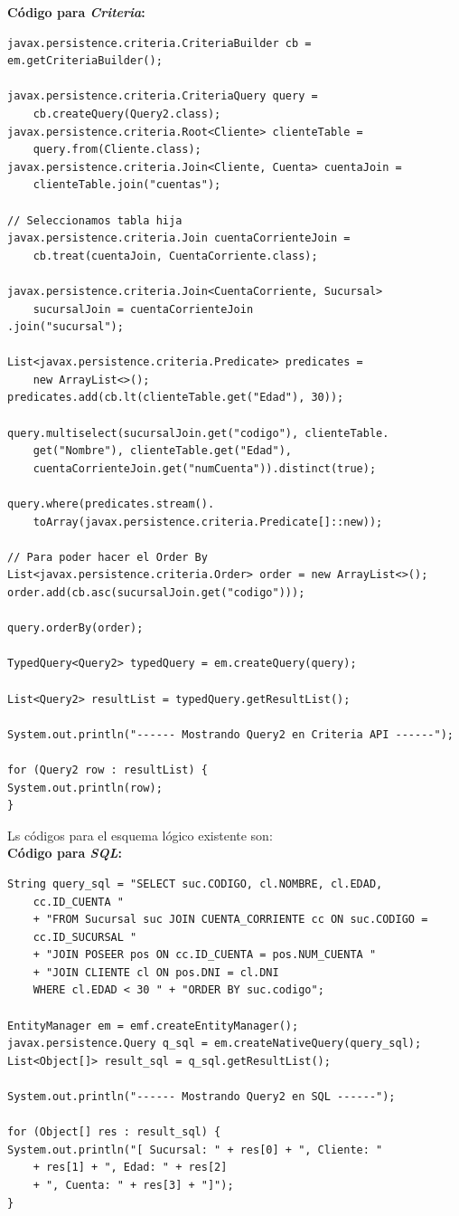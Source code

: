 \documentclass[11pt,a4paper]{article}
\begin{document}
\textbf{Código para \textit{Criteria}:}
\begin{lstlisting}
javax.persistence.criteria.CriteriaBuilder cb = em.getCriteriaBuilder();

javax.persistence.criteria.CriteriaQuery query = 
	cb.createQuery(Query2.class);
javax.persistence.criteria.Root<Cliente> clienteTable = 
	query.from(Cliente.class);
javax.persistence.criteria.Join<Cliente, Cuenta> cuentaJoin =
	clienteTable.join("cuentas");

// Seleccionamos tabla hija
javax.persistence.criteria.Join cuentaCorrienteJoin = 
	cb.treat(cuentaJoin, CuentaCorriente.class);

javax.persistence.criteria.Join<CuentaCorriente, Sucursal> 
	sucursalJoin = cuentaCorrienteJoin
.join("sucursal");

List<javax.persistence.criteria.Predicate> predicates = 
	new ArrayList<>();
predicates.add(cb.lt(clienteTable.get("Edad"), 30));

query.multiselect(sucursalJoin.get("codigo"), clienteTable.
	get("Nombre"), clienteTable.get("Edad"),
	cuentaCorrienteJoin.get("numCuenta")).distinct(true);
	
query.where(predicates.stream().
	toArray(javax.persistence.criteria.Predicate[]::new));

// Para poder hacer el Order By
List<javax.persistence.criteria.Order> order = new ArrayList<>();
order.add(cb.asc(sucursalJoin.get("codigo")));

query.orderBy(order);

TypedQuery<Query2> typedQuery = em.createQuery(query);

List<Query2> resultList = typedQuery.getResultList();

System.out.println("------ Mostrando Query2 en Criteria API ------");

for (Query2 row : resultList) {
System.out.println(row);
}
\end{lstlisting}

\bigbreak

Ls códigos para el esquema lógico existente son:\\

\textbf{Código para \textit{SQL}:}
\begin{lstlisting}
String query_sql = "SELECT suc.CODIGO, cl.NOMBRE, cl.EDAD, 
	cc.ID_CUENTA "
	+ "FROM Sucursal suc JOIN CUENTA_CORRIENTE cc ON suc.CODIGO = 
	cc.ID_SUCURSAL "
	+ "JOIN POSEER pos ON cc.ID_CUENTA = pos.NUM_CUENTA "
	+ "JOIN CLIENTE cl ON pos.DNI = cl.DNI 
	WHERE cl.EDAD < 30 " + "ORDER BY suc.codigo";

EntityManager em = emf.createEntityManager();
javax.persistence.Query q_sql = em.createNativeQuery(query_sql);
List<Object[]> result_sql = q_sql.getResultList();

System.out.println("------ Mostrando Query2 en SQL ------");

for (Object[] res : result_sql) {
System.out.println("[ Sucursal: " + res[0] + ", Cliente: " 
	+ res[1] + ", Edad: " + res[2]
	+ ", Cuenta: " + res[3] + "]");
}
\end{lstlisting}
\end{document}
